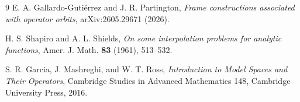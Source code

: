 \documentclass[11pt]{article}
\theoremstyle{remark}
\begin{document}
\begin{thebibliography}{9}
E. A. Gallardo-Guti\'errez and J. R. Partington,
\emph{Frame constructions associated with operator orbits},
arXiv:2605.29671 (2026).

H. S. Shapiro and A. L. Shields,
\emph{On some interpolation problems for analytic functions},
Amer. J. Math. \textbf{83} (1961), 513--532.

S. R. Garcia, J. Mashreghi, and W. T. Ross,
\emph{Introduction to Model Spaces and Their Operators},
Cambridge Studies in Advanced Mathematics 148, Cambridge University Press,
2016.
\end{thebibliography}
\end{document}
